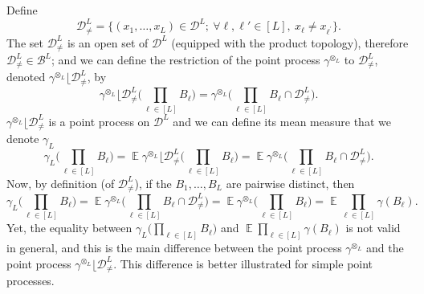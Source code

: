 \documentclass[twoside,11pt]{book}
\numberwithin{theorem}{chapter}
\numberwithin{definition}{chapter}
\numberwithin{proposition}{chapter}
\numberwithin{corollary}{chapter}
\numberwithin{example}{chapter}
\numberwithin{lemma}{chapter}
\numberwithin{assumption}{chapter}
\DeclareMathOperator{\EX}{\mathbb{E}}
\begin{document}
Define 
\begin{equation}
\mathcal{D}_{\neq}^{L} = \{ (x_{1}, \dots, x_{L}) \in \mathcal{D}^{L}; \: \forall \ell,\ell' \in [L], \: x_{\ell} \neq x_{\ell^{'}} \}.
\end{equation}
The set $\mathcal{D}_{\neq}^{L}$ is an open set of $\mathcal{D}^{L}$ (equipped with the product topology), therefore $\mathcal{D}_{\neq}^{L} \in \mathcal{B}^{L}$; and we can define the restriction of the point process $\gamma^{\otimes_L}$ to $\mathcal{D}_{\neq}^{L}$, denoted $\gamma^{\otimes_{L}} \lfloor \mathcal{D}_{\neq}^{L}$, by
\begin{equation}
\gamma^{\otimes_{L}} \lfloor \mathcal{D}_{\neq}^{L} \big(\prod\limits_{\ell \in [L]} B_\ell \big) = \gamma^{\otimes_{L}} \big( \prod\limits_{\ell \in [L]} B_\ell \cap \mathcal{D}_{\neq}^{L}   \big).
\end{equation}
$\gamma^{\otimes_{L}} \lfloor \mathcal{D}_{\neq}^{L}$ is a point process on $\mathcal{D}^L$ and we can define its mean measure that we denote $\gamma_L$ 
\begin{equation}
\gamma_{L} \big(\prod\limits_{\ell \in [L]} B_{\ell} \big)  = \EX \gamma^{\otimes_{L}} \lfloor \mathcal{D}_{\neq}^{L} \big( \prod\limits_{\ell \in [L]} B_{\ell} \big) = \EX \gamma^{\otimes_{L}} \big( \prod\limits_{\ell \in [L]} B_\ell \cap \mathcal{D}_{\neq}^{L}   \big).
\end{equation}
Now, by definition (of $\mathcal{D}_{\neq}^{L}$), if the $B_{1}, \dots, B_L$ are pairwise distinct, then 
\begin{equation}
\gamma_{L} \big(\prod\limits_{\ell \in [L]} B_{\ell} \big) = \EX \gamma^{\otimes_{L}} \big( \prod\limits_{\ell \in [L]} B_\ell \cap \mathcal{D}_{\neq}^{L}   \big) = \EX \gamma^{\otimes_{L}} \big( \prod\limits_{\ell \in [L]} B_{\ell} \big)  = \EX \prod\limits_{\ell \in [L]} \gamma(B_\ell).
\end{equation} 
Yet, the equality between $\gamma_{L} \big(\prod_{\ell \in [L]} B_{\ell} \big)$ and $\EX \prod_{\ell \in [L]} \gamma(B_\ell)$ is not valid in general, and this is  the main difference between the point process $\gamma^{\otimes_{L}}$ and the point process $\gamma^{\otimes_{L}} \lfloor \mathcal{D}_{\neq}^{L}$. This difference is better illustrated for simple point processes.
\end{document}
